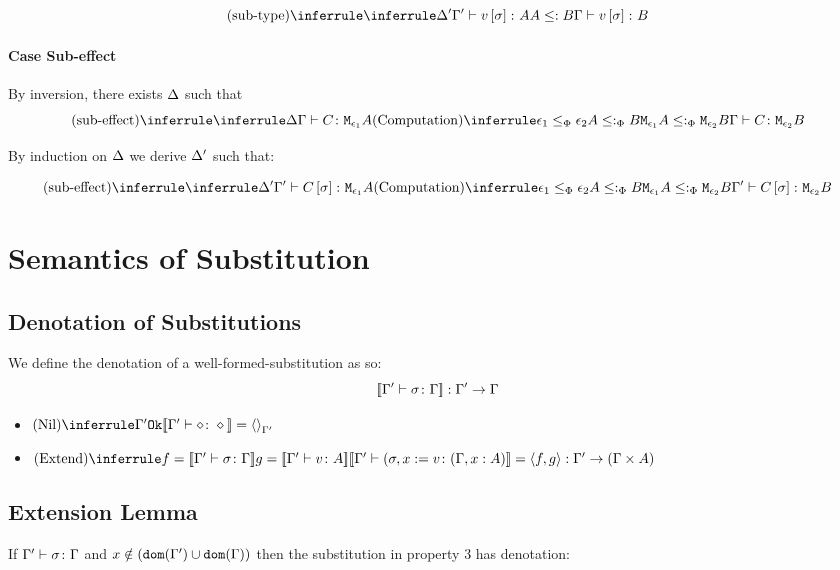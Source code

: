 {        \begin{equation}
            \ntreeruleII{sub-type}{\treeruleI{\D'}{\typerelation{\G'}{v\ssi}{A}}}{ A\subtype B}{\typerelation{\G}{v\ssi}{B}}
        \end{equation}
    \paragraph{Case Sub-effect}
    By inversion, there exists $\Delta$ such that
    \begin{equation}
        \ntreeruleII{sub-effect}{\treeruleI{\D}{\typerelation{\G}{C}{\M{\e_1}{A}}}}{ \subeffecttree{\e_1}{A}{\e_2}{B}}{\typerelation{\G}{C}{\M{\e_2}{B}}}
    \end{equation}

    By induction on $\Delta$ we derive $\Delta'$ such that:

    \begin{equation}
        \ntreeruleII{sub-effect}{\treeruleI{\D'}{\typerelation{\G'}{C\ssi}{\M{\e_1}{A}}}}{ \subeffecttree{\e_1}{A}{\e_2}{B}}{\typerelation{\G'}{C\ssi}{\M{\e_2}{B}}}
    \end{equation}
    \section{Semantics of Substitution}
    \subsection{Denotation of Substitutions}
    We define the denotation of a well-formed-substitution as so:
    \begin{equation}
        {\bf [\![}\Gamma' \vdash \sigma \colon \Gamma{\bf ]\!]}: \Gamma' \rightarrow \Gamma
    \end{equation}
    \begin{itemize}
        \item $\ntreeruleI{Nil}{\ok{\G'}}{\deno{\typerelation{\G'}{\nil}{\nil}} = \term{\G'}}$
        \item $\ntreeruleII{Extend}{f = \deno{\typerelation{\G'}{\si}{\G}}}{ g= \deno{\typerelation{\G'}{v}{A}}}{\deno{\typerelation{\G'}{(\si, x\setto v}{(\gax)}} = \pr{f}{g}:\G' \rightarrow (\G\times A)}$
    \end{itemize}
    \subsection{Extension Lemma}
    If $\Gamma' \vdash \sigma \colon \Gamma$ and $x\notin(\texttt{dom}(\Gamma')\cup\texttt{dom}(\Gamma))$ then the substitution in property 3 has denotation:

}
